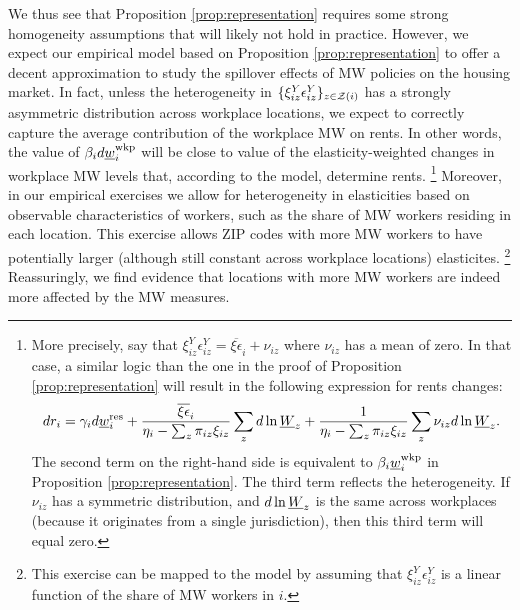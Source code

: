 We thus see that Proposition \ref{prop:representation} requires some strong 
homogeneity assumptions that will likely not hold in practice.
However, we expect our empirical model based on Proposition 
\ref{prop:representation} to offer a decent approximation to study the spillover
effects of MW policies on the housing market.
In fact, unless the heterogeneity in $\{\xi_{iz}^Y\epsilon_{iz}^Y\}_{z\in\mathcal{Z}(i)}$ 
has a strongly asymmetric distribution across workplace locations, we expect to 
correctly capture the average contribution of the workplace MW on rents.
In other words, the value of $\beta_i  d \underline{w}^{\text{wkp}}_i$ will be close to value of 
the elasticity-weighted changes in workplace MW levels that, according to the 
model, determine rents.%
\footnote{More precisely, say that 
$\xi^Y_{iz}\epsilon_{iz}^Y = \overline{\xi\epsilon}_i + \nu_{iz}$ where 
$\nu_{iz}$ has a mean of zero.
In that case, a similar logic than the one in the proof of 
Proposition \ref{prop:representation} will result in  the following expression 
for rents changes:
$$
    d r_i = \gamma_i d \underline{w}^{\text{res}}_i
          + \frac{\overline{\xi\epsilon}_i}
                 {\eta_{i} - \sum_z \pi_{iz} \xi_{iz}} \sum_z d\ln \underline{W}_z
          + \frac{1}
                 {\eta_{i} - \sum_z \pi_{iz} \xi_{iz}} \sum_z \nu_{iz} d\ln \underline{W}_z .
$$
The second term on the right-hand side is equivalent to $\beta_i \underline{w}_{i}^{\text{wkp}}$
in Proposition \ref{prop:representation}.
The third term reflects the heterogeneity.
If $\nu_{iz}$ has a symmetric distribution, and $d\ln \underline{W}_z$ is the same across 
workplaces (because it originates from a single jurisdiction), then this third 
term will equal zero.}
Moreover, in our empirical exercises we allow for heterogeneity in elasticities
based on observable characteristics of workers, 
such as the share of MW workers residing in each location.
This exercise allows ZIP codes with more MW workers to have potentially larger 
(although still constant across workplace locations) elasticites.%
\footnote{This exercise can be mapped to the model by assuming that 
$\xi^Y_{iz} \epsilon_{iz}^Y$ is a linear function of the share of MW workers
in $i$.}
Reassuringly, we find evidence that locations with more MW workers are indeed 
more affected by the MW measures.
